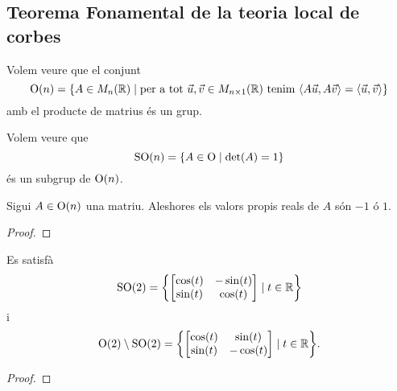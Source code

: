 \documentclass[../../Main.tex]{subfiles}
\begin{document}
	\subsection{Teorema Fonamental de la teoria local de corbes}
	\begin{example}
		\label{ex:grup ortogonal}
		Volem veure que el conjunt
		\[\GrupOrtogonal(n)=\{A\in\matrius_{n}(\mathbb{R})\mid\text{per a tot }\vec{u},\vec{v}\in\matrius_{n\times1}(\mathbb{R})\text{ tenim }\prodesc{A\vec{u}}{A\vec{v}}=\prodesc{\vec{u}}{\vec{v}}\}\]
		amb el producte de matrius és un grup.
		\begin{solution}
		\end{solution}
	\end{example}
	\begin{example}
		\label{ex:grup especial ortogonal}
		Volem veure que
		\[\operatorname{SO}(n)=\{A\in\operatorname{O}\mid\det(A)=1\}\]
		és un subgrup de \(\operatorname{O}(n)\).
		\begin{solution}
		\end{solution}
	\end{example}
	\begin{proposition}
		\label{prop:els valors propis d'una matriu ortogonal són -1 o 1}
		Sigui \(A\in\operatorname{O}(n)\) una matriu. Aleshores els valors propis reals de \(A\) són \(-1\) ó \(1\).
		\begin{proof}
		\end{proof}
	\end{proposition}
	\begin{proposition}
		\label{prop:caracterització de les matrius ortogonals 2x2}
		Es satisfà
		\[\GrupEspecialOrtogonal(2)=\left\{\begin{bmatrix}
			\cos(t) & -\sin(t) \\
			\sin(t) & \cos(t)
		\end{bmatrix}\mid t\in\mathbb{R}\right\}\]
		i
		\[\GrupOrtogonal(2)\setminus\GrupEspecialOrtogonal(2)=\left\{\begin{bmatrix}
			\cos(t) & \sin(t) \\
			\sin(t) & -\cos(t)
		\end{bmatrix}\mid t\in\mathbb{R}\right\}.\]
		\begin{proof}
		\end{proof}
	\end{proposition}
\end{document}
